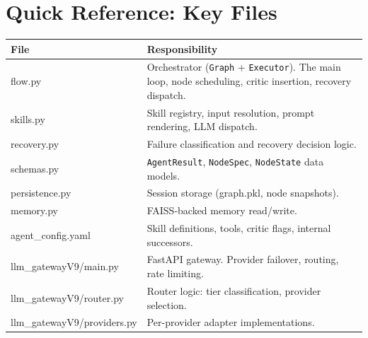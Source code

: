 \documentclass[12pt,a4paper]{article}
\begin{document}
\section{Quick Reference: Key Files}

\begin{center}
\begin{tabular}{>{\ttfamily}p{5cm} p{8.5cm}}
\toprule
\normalfont\textbf{File} & \normalfont\textbf{Responsibility} \\
\midrule
flow.py         & Orchestrator (\texttt{Graph} + \texttt{Executor}). The main loop,
                  node scheduling, critic insertion, recovery dispatch. \\
skills.py       & Skill registry, input resolution, prompt rendering, LLM dispatch. \\
recovery.py     & Failure classification and recovery decision logic. \\
schemas.py      & \texttt{AgentResult}, \texttt{NodeSpec}, \texttt{NodeState} data models. \\
persistence.py  & Session storage (graph.pkl, node snapshots). \\
memory.py       & FAISS-backed memory read/write. \\
agent\_config.yaml & Skill definitions, tools, critic flags, internal successors. \\
\midrule
llm\_gatewayV9/main.py    & FastAPI gateway. Provider failover, routing, rate limiting. \\
llm\_gatewayV9/router.py  & Router logic: tier classification, provider selection. \\
llm\_gatewayV9/providers.py & Per-provider adapter implementations. \\
\bottomrule
\end{tabular}
\end{center}
\end{document}
